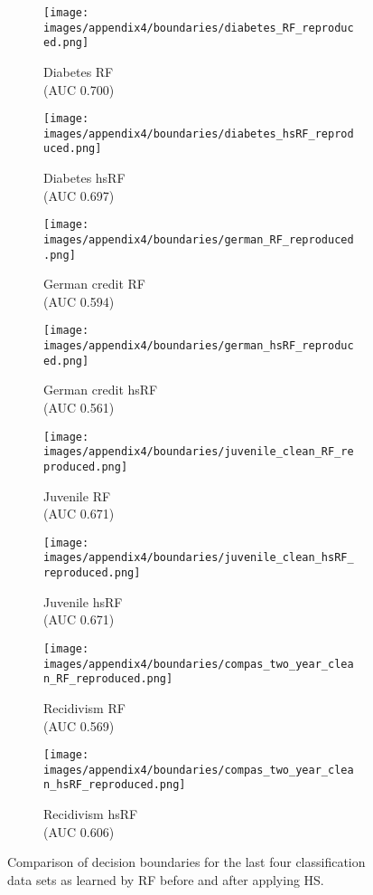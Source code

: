\begin{figure}[hbt]
    \centering
    \begin{subfigure}[b]{0.45\textwidth}
        \centering
        \texttt{[image: images/appendix4/boundaries/diabetes\_RF\_reproduced.png]}
        \caption{Diabetes RF \\ (AUC 0.700)}
    \end{subfigure}
    \begin{subfigure}[b]{0.45\textwidth}
        \centering
        \texttt{[image: images/appendix4/boundaries/diabetes\_hsRF\_reproduced.png]}
        \caption{Diabetes hsRF \\ (AUC 0.697)}
    \end{subfigure}
    
    \begin{subfigure}[b]{0.45\textwidth}
        \centering
        \texttt{[image: images/appendix4/boundaries/german\_RF\_reproduced.png]}
        \caption{German credit RF \\ (AUC 0.594)}
    \end{subfigure}
    \begin{subfigure}[b]{0.45\textwidth}
        \centering
        \texttt{[image: images/appendix4/boundaries/german\_hsRF\_reproduced.png]}
        \caption{German credit hsRF \\ (AUC 0.561)}
    \end{subfigure}
    
    \begin{subfigure}[b]{0.45\textwidth}
        \centering
        \texttt{[image: images/appendix4/boundaries/juvenile\_clean\_RF\_reproduced.png]}
        \caption{Juvenile RF \\ (AUC 0.671)}
    \end{subfigure}
    \begin{subfigure}[b]{0.45\textwidth}
        \centering
        \texttt{[image: images/appendix4/boundaries/juvenile\_clean\_hsRF\_reproduced.png]}
        \caption{Juvenile hsRF \\ (AUC 0.671)}
    \end{subfigure}
    
    \begin{subfigure}[b]{0.45\textwidth}
        \centering
        \texttt{[image: images/appendix4/boundaries/compas\_two\_year\_clean\_RF\_reproduced.png]}
        \caption{Recidivism RF \\ (AUC 0.569)}
    \end{subfigure}
    \begin{subfigure}[b]{0.45\textwidth}
        \centering
        \texttt{[image: images/appendix4/boundaries/compas\_two\_year\_clean\_hsRF\_reproduced.png]}
        \caption{Recidivism hsRF \\ (AUC 0.606)}
    \end{subfigure}
    \caption{Comparison of decision boundaries for the last four classification data sets as learned by RF before and after applying HS.}
    \label{fig:apx4-boundary2}
\end{figure}

